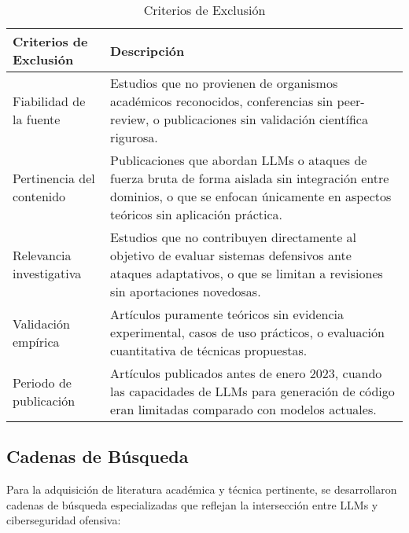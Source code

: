 \begin{table}[h]
\centering
\caption{Criterios de Exclusión}
\label{tab:criterios_exclusion}
\begin{tabular}{|p{4cm}|p{8cm}|}
\hline
\textbf{Criterios de Exclusión} & \textbf{Descripción} \\
\hline
Fiabilidad de la fuente & Estudios que no provienen de organismos académicos reconocidos, conferencias sin peer-review, o publicaciones sin validación científica rigurosa. \\
\hline
Pertinencia del contenido & Publicaciones que abordan LLMs o ataques de fuerza bruta de forma aislada sin integración entre dominios, o que se enfocan únicamente en aspectos teóricos sin aplicación práctica. \\
\hline
Relevancia investigativa & Estudios que no contribuyen directamente al objetivo de evaluar sistemas defensivos ante ataques adaptativos, o que se limitan a revisiones sin aportaciones novedosas. \\
\hline
Validación empírica & Artículos puramente teóricos sin evidencia experimental, casos de uso prácticos, o evaluación cuantitativa de técnicas propuestas. \\
\hline
Periodo de publicación & Artículos publicados antes de enero 2023, cuando las capacidades de LLMs para generación de código eran limitadas comparado con modelos actuales. \\
\hline
\end{tabular}
\end{table}

\subsection{Cadenas de Búsqueda}

Para la adquisición de literatura académica y técnica pertinente, se desarrollaron cadenas de búsqueda especializadas que reflejan la intersección entre LLMs y ciberseguridad ofensiva:

